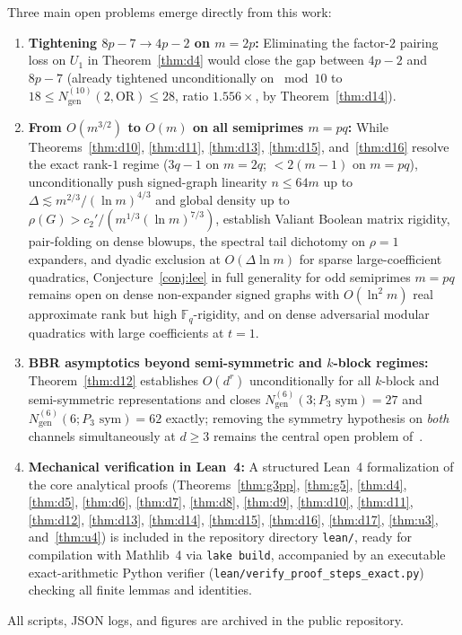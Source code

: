 \documentclass[11pt,a4paper]{article}
\theoremstyle{definition}
\newcommand{\F}{\mathbb{F}}
\newcommand{\OR}{\mathrm{OR}}
\newcommand{\Ngen}{N_{\mathrm{gen}}}
\begin{document}
Three main open problems emerge directly from this work:
\begin{enumerate}[leftmargin=*]
  \item \textbf{Tightening $8p - 7 \to 4p - 2$ on $m = 2p$:} Eliminating the factor-$2$ pairing loss on $U_1$ in Theorem~\ref{thm:d4} would close the gap between $4p - 2$ and $8p - 7$ (already tightened unconditionally on $\bmod 10$ to $18 \le \Ngen^{(10)}(2, \OR) \le 28$, ratio $1.556\times$, by Theorem~\ref{thm:d14}).
  \item \textbf{From $O(m^{3/2})$ to $O(m)$ on all semiprimes $m = pq$:} While Theorems~\ref{thm:d10}, \ref{thm:d11}, \ref{thm:d13}, \ref{thm:d15}, and~\ref{thm:d16} resolve the exact rank-$1$ regime ($3q-1$ on $m = 2q$; $< 2(m-1)$ on $m = pq$), unconditionally push signed-graph linearity $n \le 64m$ up to $\Delta \lesssim m^{2/3}/(\ln m)^{4/3}$ and global density up to $\rho(G) > c_2'/(m^{1/3}(\ln m)^{7/3})$, establish Valiant Boolean matrix rigidity, pair-folding on dense blowups, the spectral tail dichotomy on $\rho = 1$ expanders, and dyadic exclusion at $O(\Delta \ln m)$ for sparse large-coefficient quadratics, Conjecture~\ref{conj:lee} in full generality for odd semiprimes $m = pq$ remains open on dense non-expander signed graphs with $O(\ln^2 m)$ real approximate rank but high $\F_q$-rigidity, and on dense adversarial modular quadratics with large coefficients at $t = 1$.
  \item \textbf{BBR asymptotics beyond semi-symmetric and $k$-block regimes:} Theorem~\ref{thm:d12} establishes $O(d^r)$ unconditionally for all $k$-block and semi-symmetric representations and closes $\Ngen^{(6)}(3; P_3\text{ sym}) = 27$ and $\Ngen^{(6)}(6; P_3\text{ sym}) = 62$ exactly; removing the symmetry hypothesis on \emph{both} channels simultaneously at $d \ge 3$ remains the central open problem of~\cite{BBR94}.
  \item \textbf{Mechanical verification in Lean~4:} A structured Lean~4 formalization of the core analytical proofs (Theorems~\ref{thm:g3pp}, \ref{thm:g5}, \ref{thm:d4}, \ref{thm:d5}, \ref{thm:d6}, \ref{thm:d7}, \ref{thm:d8}, \ref{thm:d9}, \ref{thm:d10}, \ref{thm:d11}, \ref{thm:d12}, \ref{thm:d13}, \ref{thm:d14}, \ref{thm:d15}, \ref{thm:d16}, \ref{thm:d17}, \ref{thm:u3}, and~\ref{thm:u4}) is included in the repository directory \texttt{lean/}, ready for compilation with Mathlib~4 via \texttt{lake build}, accompanied by an executable exact-arithmetic Python verifier (\texttt{lean/verify\_proof\_steps\_exact.py}) checking all finite lemmas and identities.
\end{enumerate}

All scripts, JSON logs, and figures are archived in the public repository.



\end{document}
